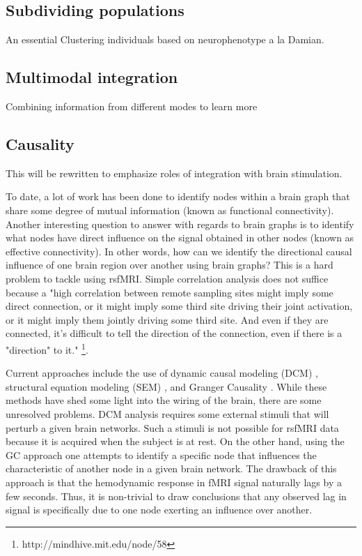 \subsection{Subdividing populations}

An essential 
Clustering individuals based on neurophenotype a la Damian.

\subsection{Multimodal integration}

Combining information from different modes to learn more

\subsection{Causality}

This will be rewritten to emphasize roles of integration with brain stimulation.

To date, a lot of work has been done to identify nodes within a brain graph that share some degree of mutual information (known as functional connectivity). Another interesting question to answer with regards to brain graphs is to identify what nodes have direct influence on the signal obtained in other nodes (known as effective connectivity). In other words, how can we identify the directional causal influence of one brain region over another using brain graphs? This is a hard problem to tackle using rsfMRI. Simple correlation analysis does not suffice because a "high correlation between remote sampling sites might imply some direct connection, or it might imply some third site driving their joint activation, or it might imply them jointly driving some third site. And even if they are connected, it's difficult to tell the direction of the connection, even if there is a "direction" to it." \footnote{http://mindhive.mit.edu/node/58}. 

Current approaches include the use of dynamic causal modeling (DCM) \cite{}, structural equation modeling (SEM) \cite{}, and Granger Causality \cite{}. While these methods have shed some light into the wiring of the brain, there are some unresolved problems. DCM analysis requires some external stimuli that will perturb a given brain networks. Such a stimuli is not possible for rsfMRI data because it is acquired when the subject is at rest. On the other hand, using the GC approach one attempts to identify a specific node that influences the characteristic of another node in a given brain network. The drawback of this approach is that the hemodynamic response in fMRI signal naturally lags by a few seconds. Thus, it is non-trivial to draw conclusions that any observed lag in signal is specifically due to one node exerting an influence over another.   

